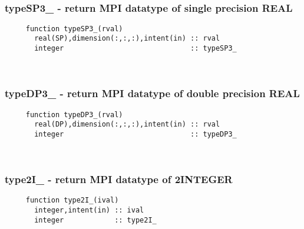  
\mbox{}\hrulefill\ 
 
  \subsubsection{typeSP3\_ - return MPI datatype of single precision REAL}

\begin{verbatim} 
     function typeSP3_(rval)
       real(SP),dimension(:,:,:),intent(in) :: rval
       integer                              :: typeSP3_
 \end{verbatim}%
 
 
\mbox{}\hrulefill\ 
 
  \subsubsection{typeDP3\_ - return MPI datatype of double precision REAL}

\begin{verbatim} 
     function typeDP3_(rval)
       real(DP),dimension(:,:,:),intent(in) :: rval
       integer                              :: typeDP3_
 \end{verbatim}%
 
 
\mbox{}\hrulefill\ 
 

  \subsubsection{type2I\_ - return MPI datatype of 2INTEGER}

\begin{verbatim} 
     function type2I_(ival)
       integer,intent(in) :: ival
       integer            :: type2I_
 \end{verbatim}%
 
